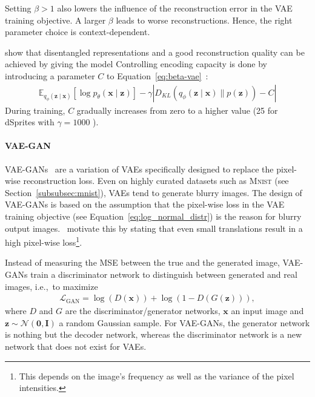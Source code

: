 Setting $\beta > 1$ also lowers the influence of the reconstruction error in the \ac{VAE} training objective.
A larger $\beta$ leads to worse reconstructions.
Hence, the right parameter choice is context-dependent.

\citet{burgess2018understanding} show that disentangled representations and a good reconstruction quality can be achieved by giving the model 
Controlling encoding capacity is done by introducing a parameter $C$ to Equation~\ref{eq:beta-vae}~\citep{burgess2018understanding}:
\begin{align}
    \mathbb{E}_{q_{\phi}(\mathbf{z} \mid \bm{x})}\left[\log p_{\theta}(\bm{x} \mid \bm{z})\right]-\gamma\left|D_{K L}\left(q_{\phi}(\bm{z} \mid \bm{x}) \| p(\bm{z})\right)-C\right|
\end{align}
During training, $C$ gradually increases from zero to a higher value (25 for dSprites with $\gamma=1000$ \citep{burgess2018understanding}).

\paragraph{\ac{VAE}-\ac{GAN}}
\ac{VAE}-\acp{GAN}~\citep{larsen2015autoencoding} are a variation of \acp{VAE} specifically designed to replace the pixel-wise reconstruction loss.
Even on highly curated datasets such as \textsc{Mnist} (see Section~\ref{subsubsec:mnist}), \acp{VAE} tend to generate blurry images.
The design of \ac{VAE}-\acp{GAN} is based on the assumption that the pixel-wise loss in the \ac{VAE} training objective (see Equation~\ref{eq:log_normal_distr}) is the reason for blurry output images.
\citet{larsen2015autoencoding}~motivate this by stating that even small translations result in a high pixel-wise loss\footnote{This depends on the image's frequency as well as the variance of the pixel intensities.}.

Instead of measuring the \ac{MSE} between the true and the generated image, \ac{VAE}-\acp{GAN} train a discriminator network to distinguish between generated and real images, i.e.,~to maximize
\begin{align}
    \mathcal{L}_{\mathrm{GAN}}=\log (D(\bm{x}))+\log (1-D(G(\bm{z}))), \label{eq:vae_gan_l_gan}
\end{align}
where $D$ and $G$ are the discriminator/generator networks, $\bm{x}$ an input image and $\bm{z}\sim \mathcal{N}(\bm{0},\bm{I})$ a random Gaussian sample.
For \ac{VAE}-\acp{GAN}, the generator network is nothing but the decoder network, whereas the discriminator network is a new network that does not exist for \acp{VAE}.

